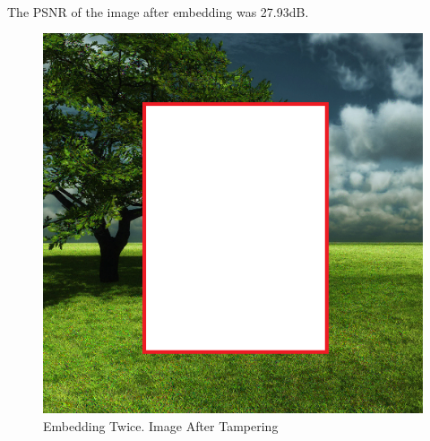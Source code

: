 \documentclass[12pt]{article}
\begin{document}
\hspace{0pt} \\
The PSNR of the image after embedding was 27.93dB.

\begin{figure}[h]
\centerline{%
\includegraphics[scale=0.45]{"Tree Embed twice 0.8 threshold/finalImage - Copy"}%
}%
\caption{Embedding Twice. Image After Tampering}
\label{fig:treeEmbedTwiceTamper}
\end{figure}
\end{document}
